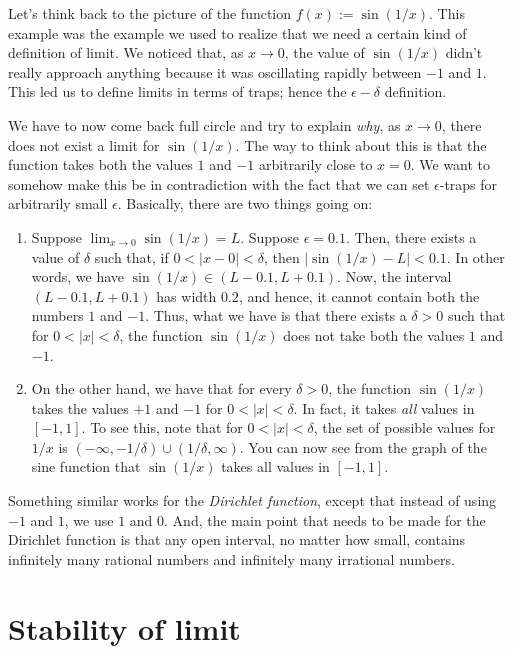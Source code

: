 \documentclass[10pt]{amsart}
\begin{document}
Let's think back to the picture of the function $f(x) :=
\sin(1/x)$. This example was the example we used to realize that we
need a certain kind of definition of limit. We noticed that, as $x \to
0$, the value of $\sin(1/x)$ didn't really approach anything because
it was oscillating rapidly between $-1$ and $1$. This led us to define
limits in terms of traps; hence the $\epsilon-\delta$ definition.

We have to now come back full circle and try to explain {\em why}, as
$x \to 0$, there does not exist a limit for $\sin(1/x)$. The way to
think about this is that the function takes both the values $1$ and
$-1$ arbitrarily close to $x = 0$. We want to somehow make this be in
contradiction with the fact that we can set $\epsilon$-traps for
arbitrarily small $\epsilon$. Basically, there are two things going on:

\begin{enumerate}

\item Suppose $\lim_{x \to 0} \sin(1/x) = L$. Suppose $\epsilon =
  0.1$. Then, there exists a value of $\delta$ such that, if $0 < |x -
  0| < \delta$, then $|\sin(1/x) - L| < 0.1$. In other words, we have
  $\sin(1/x) \in (L - 0.1,L + 0.1)$. Now, the interval $(L -
  0.1,L + 0.1)$ has width $0.2$, and hence, it cannot contain both the
  numbers $1$ and $-1$. Thus, what we have is that there exists a
  $\delta > 0$ such that for $0 < |x| < \delta$, the function
  $\sin(1/x)$ does not take both the values $1$ and $-1$.

\item On the other hand, we have that for every $\delta > 0$, the
  function $\sin(1/x)$ takes the values $+1$ and $-1$ for $0 < |x| <
  \delta$. In fact, it takes {\em all} values in $[-1,1]$. To see
  this, note that for $0 < |x| < \delta$, the set of possible values
  for $1/x$ is $(-\infty,-1/\delta) \cup (1/\delta,\infty)$. You can
  now see from the graph of the sine function that $\sin(1/x)$ takes
  all values in $[-1,1]$.

\end{enumerate}

Something similar works for the {\em Dirichlet function}, except that
instead of using $-1$ and $1$, we use $1$ and $0$. And, the main point
that needs to be made for the Dirichlet function is that any open
interval, no matter how small, contains infinitely many rational
numbers and infinitely many irrational numbers.

\section{Stability of limit}
\end{document}
